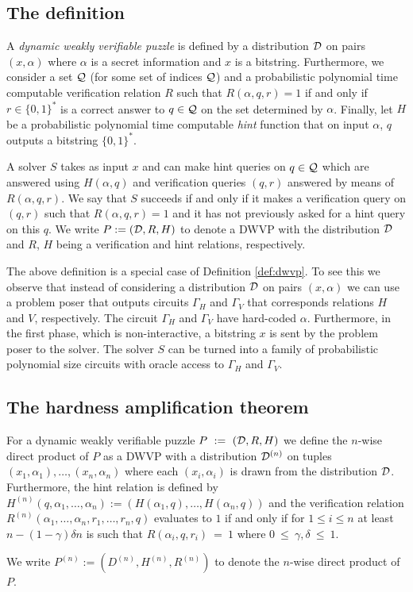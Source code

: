 \subsection{The definition}
\begin{definition}
  \label{def:dwvp_dodis}
  A \textit{dynamic weakly verifiable puzzle} is defined by a distribution $\mathcal{D}$ on pairs $(x, \alpha)$ where
  $\alpha$ is a secret information and $x$ is a bitstring.
  Furthermore, we consider a set $\mathcal{Q}$ (for some set of indices $\mathcal{Q}$) and a probabilistic polynomial time computable verification relation $R$ such that
  $R(\alpha, q, r) = 1$ if and only if $r \in \{0,1\}^{*}$ is a correct answer to $q \in \mathcal{Q}$
  on the set determined by $\alpha$. Finally, let $H$ be a probabilistic polynomial time computable \textit{hint} function
  that on input $\alpha$, $q$ outputs a bitstring $\{0,1\}^{*}$.

  A solver $S$ takes as input $x$ and can make hint queries on $q \in \mathcal{Q}$ which are answered using $H(\alpha, q)$ and verification
  queries $(q,r)$ answered by means of $R(\alpha, q, r)$.
  We say that $S$ succeeds if and only if it makes a verification query on $(q,r)$ such that
  $R(\alpha,q,r) = 1$ and it has not previously asked for a hint query on this $q$.
  We write $P := (\mathcal{D}, R, H)$ to denote a DWVP with the distribution $\mathcal{D}$ and $R$, $H$ being a verification and hint relations, respectively.
\end{definition}
%
The above definition is a special case of Definition \ref{def:dwvp}.
To see this we observe that instead of considering a distribution $\mathcal{D}$ on pairs $(x,\alpha)$
we can use a problem poser that outputs circuits $\Gamma_H$ and $\Gamma_V$ that corresponds relations $H$ and $V$, respectively.
The circuit $\Gamma_H$ and $\Gamma_V$ have hard-coded $\alpha$.
Furthermore, in the first phase, which is non-interactive, a bitstring $x$ is sent by the problem poser to the solver.
The solver $S$ can be turned into a family of probabilistic polynomial size circuits with oracle access to $\Gamma_H$ and $\Gamma_V$.

\subsection{The hardness amplification theorem}
\begin{definition}
  \label{def:n-wdp-dwvp}
For a dynamic weakly verifiable puzzle $P~:=~(\mathcal{D}, R, H)$ we define the $n$-wise direct product of $P$
as a DWVP with a distribution $\mathcal{D}^{(n)}$ on tuples $(x_1, \alpha_1), \dotsc, (x_n, \alpha_n)$ where
each $(x_i, \alpha_i)$ is drawn from the distribution $\mathcal{D}$.
Furthermore, the hint relation is defined by $H^{(n)}(q, \alpha_1, \dotsc, \alpha_n) := (H(\alpha_1, q), \dotsc, H(\alpha_n, q))$ and
the verification relation $R^{(n)}(\alpha_1, \dotsc, \alpha_n, r_1, \dotsc, r_n, q)$ evaluates to $1$ if and only if
for $1\!\leq\!i\!\leq\!n$ at least $n - (1 - \gamma)\delta n$ is such that $R(\alpha_i, q, r_i)~=~1$ where $0~\leq~\gamma,\delta~\leq~1$.
%
\end{definition}
We write $P^{(n)} := (D^{(n)}, H^{(n)}, R^{(n)})$ to denote the $n$-wise direct product of $P$.

